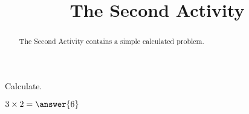 \documentclass{ximera}
\title{The Second Activity}
\begin{document}
  
\begin{abstract}  
The Second Activity contains a simple calculated problem.
\end{abstract}  
\maketitle    
  Calculate.
\begin{question}  
$3\times 2 = \answer{6}$  
\end{question} 
\end{document}
